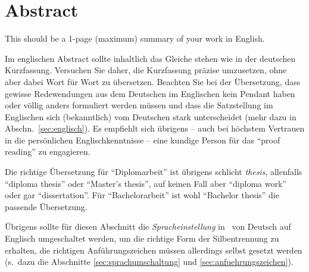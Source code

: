 \chapter{Abstract}

\begin{english} %
This should be a 1-page (maximum) summary of your work in English.
\end{english}

Im englischen Abstract sollte inhaltlich das Gleiche
stehen wie in der deutschen Kurzfassung. Versuchen Sie daher, die
Kurzfassung prä\-zise umzusetzen, ohne aber dabei Wort für Wort zu
übersetzen. Beachten Sie bei der Übersetzung, dass gewisse
Redewendungen aus dem Deutschen im Englischen kein Pendant haben
oder völlig anders formuliert werden müssen und dass die
Satzstellung im Englischen sich (bekanntlich) vom Deutschen stark
unterscheidet (mehr dazu in Abschn.\ \ref{sec:englisch}). Es
empfiehlt sich übrigens -- auch bei höchstem Vertrauen in die
persönlichen Englischkenntnisse -- eine kundige Person für das
"`proof reading"' zu engagieren.

Die richtige Übersetzung für "`Diplomarbeit"' ist übrigens
schlicht \emph{thesis}, allenfalls  "`diploma thesis"' oder "`Master's thesis"', 
auf keinen Fall aber "`diploma work"' oder gar "`dissertation"'. 
Für "`Bachelorarbeit"' ist wohl "`Bachelor thesis"' die passende Übersetzung. 

Übrigens sollte für diesen Abschnitt die \emph{Spracheinstellung} in \latex\ von Deutsch
auf Englisch umgeschaltet werden, um die richtige Form der
Silbentrennung zu erhalten, die richtigen Anführungszeichen müssen allerdings selbst gesetzt werden %
(s.\ dazu die Abschnitte \ref{sec:sprachumschaltung} %
und \ref{sec:anfuehrungszeichen}).
